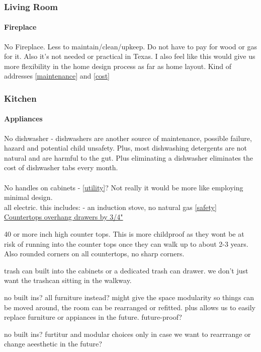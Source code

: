 \documentclass{article}
\begin{document}
\subsubsection{Living Room}
\paragraph{Fireplace}
No Fireplace. Less to maintain/clean/upkeep. Do not have to pay for wood or gas for it. Also it's not needed or practical in Texas. I also feel like this would give us more flexibility in the home design process as far as home layout. Kind of addresses \ref{maintenance} and \ref{cost}


\subsubsection{Kitchen}
\paragraph{Appliances}
No dishwasher - dishwashers are another source of maintenance, possible failure, hazard and potential child unsafety. Plus, most dishwashing detergents are not natural and are harmful to the gut. Plus eliminating a dishwasher eliminates the cost of dishwasher tabs every month.
\paragraph{}
No handles on cabinets - \ref{utility}? Not really it would be more like employing minimal design.\\
all electric. this includes:
    - an induction stove, no natural gas \ref{safety} \\
\href{https://youtu.be/npPhvvmTyWM?t=600}{Countertops overhang drawers by 3/4"}

40 or more inch high counter tops. This is more childproof as they wont be at risk of running into the counter tops once they can walk up to about 2-3 years. Also rounded corners on all countertops, no sharp corners.

trash can built into the cabinets or a dedicated trash can drawer. we don't just want the trashcan sitting in the walkway.

no built ins? all furniture instead? might give the space modularity so things can be moved around, the room can be rearranged or refitted. plus allows us to easily replace furniture or appiances in the future. future-proof?

no built ins? furtitur and modular choices only in case we want to rearrrange or change aeesthetic in the future?
\end{document}
